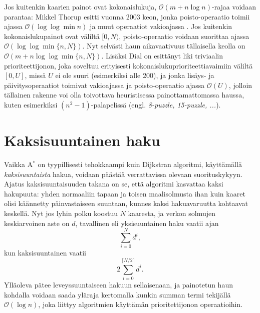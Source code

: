 \documentclass[finnish]{tktltiki2}
\theoremstyle{definition}
\theoremstyle{remark}
\begin{document}
Jos kuitenkin kaarien painot ovat kokonaislukuja, $\mathcal{O}(m + n \log n)$-rajaa voidaan parantaa:
Mikkel Thorup esitti vuonna 2003 keon, jonka poisto-operaatio toimii ajassa $\mathcal{O}(\log \log \min n)$ ja muut operaatiot vakioajassa \cite{Thorup03}. Jos kuitenkin kokonaislukupainot ovat väliltä $[0, N)$, poisto-operaatio voidaan suorittaa ajassa $\mathcal{O}(\log \log \min \{ n, N \})$. Nyt selvästi haun aikavaativuus tällaisella keolla on $\mathcal{O}(m + n \log \log \min \{n, N \})$. Lisäksi Dial on esittänyt liki triviaalin prioriteettijonon, joka soveltuu erityisesti kokonaislukuprioriteettiavaimiin väliltä $[0, U]$, missä $U$ ei ole suuri (esimerkiksi alle 200), ja jonka lisäys- ja päivitysoperaatiot toimivat vakioajassa ja poisto-operaatio ajassa $\mathcal{O}(U)$, jolloin tällainen rakenne voi olla toivottava heuristisessa painottamattomassa haussa, kuten esimerkiksi $(n^2 - 1)$-palapelissä (engl. \textit{8-puzzle, 15-puzzle, ...}).

\section{Kaksisuuntainen haku}
Vaikka A$^{\ast}$ on tyypillisesti tehokkaampi kuin Dijkstran algoritmi, käyttämällä \textit{kaksisuuntaista} hakua, voidaan päästää verrattavissa olevaan suorituskykyyn. Ajatus kaksisuuntaisuuden takana on se, että algoritmi kasvattaa kaksi hakupuuta: yhden normaaliin tapaan ja toisen maalisolmusta ihan kuin kaaret olisi käännetty päinvastaiseen suuntaan, kunnes kaksi hakuavaruutta kohtaavat keskellä. Nyt jos lyhin polku koostuu $N$ kaaresta, ja verkon solmujen keskiarvoinen aste on $d$, tavallinen eli yksisuuntainen haku vaatii ajan
\[
\sum_{i = 0}^N d^i,
\]
kun kaksisuuntainen vaatii
\[
2 \sum_{i = 0}^{\lceil N / 2 \rceil} d^i.
\]
Ylläoleva pätee leveyssuuntaiseen hakuun sellaisenaan, ja painotetun haun kohdalla voidaan saada yläraja kertomalla kunkin summan termi tekijällä $\mathcal{O}(\log n)$, joka liittyy algoritmien käyttämän prioritettijonon operaatioihin. 
\end{document}
